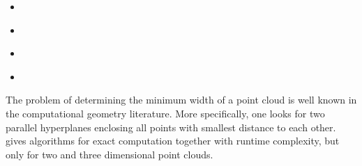 
\begin{itemize}
    \item \cite{10.1145/1008731.1008736}
    \item \cite{gritzmann_computational_1993}
    \item \cite{ahn_minimum-width_2025}
    \item \cite{ahn_k_2025}
\end{itemize}

The problem of determining the minimum width of a point cloud is well known in the computational geometry literature. More specifically, one looks for two parallel hyperplanes enclosing all points with smallest distance to each other. \cite{10.1145/323233.323234} gives algorithms for exact computation together with runtime complexity, but only for two and three dimensional point clouds.